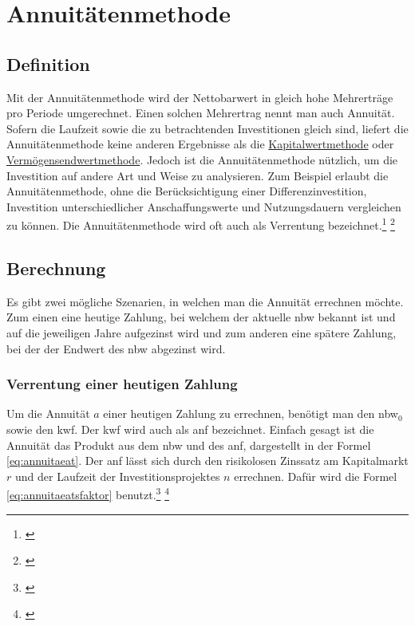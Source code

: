 \chapter{Annuitätenmethode}
\label{Annuitaetenmethode}

\section{Definition}


Mit der Annuitätenmethode wird der Nettobarwert in gleich hohe Mehrerträge pro Periode umgerechnet. Einen solchen Mehrertrag nennt man auch Annuität. Sofern die Laufzeit sowie die zu betrachtenden Investitionen gleich sind, liefert die Annuitätenmethode keine anderen Ergebnisse als die \hyperref[Kapitalwertmethode]{Kapitalwertmethode} oder \hyperref[Vermoegensendwertmethode]{Vermögensendwertmethode}. Jedoch ist die Annuitätenmethode nützlich, um die Investition auf andere Art und Weise zu analysieren. Zum Beispiel erlaubt die Annuitätenmethode, ohne die Berücksichtigung einer Differenzinvestition, Investition unterschiedlicher Anschaffungswerte und Nutzungsdauern vergleichen zu können. Die Annuitätenmethode wird oft auch als Verrentung bezeichnet.\footnote{\cite{bwllexicon-annu}} \footnote{\cite{wikipedia-annu}}


\section{Berechnung}

Es gibt zwei mögliche Szenarien, in welchen man die Annuität errechnen möchte. Zum einen eine heutige Zahlung, bei welchem der aktuelle \ac{nbw} bekannt ist und auf die jeweiligen Jahre aufgezinst wird und zum anderen eine spätere Zahlung, bei der der Endwert des \ac{nbw} abgezinst wird.

\subsection{Verrentung einer heutigen Zahlung}

Um die Annuität $a$ einer heutigen Zahlung zu errechnen, benötigt man den \ac{nbw}$_0$ sowie den \ac{kwf}. Der \ac{kwf} wird auch als \ac{anf} bezeichnet. Einfach gesagt ist die Annuität das Produkt aus dem \ac{nbw} und des \ac{anf}, dargestellt in der Formel \eqref{eq:annuitaeat}. Der \ac{anf} lässt sich durch den risikolosen Zinssatz am Kapitalmarkt $r$ und der Laufzeit der Investitionsprojektes $n$ errechnen. Dafür wird die Formel \eqref{eq:annuitaeatsfaktor} benutzt.\footnote{\cite{studyflix-annu}} \footnote{\cite{bwllexicon-annu}}

